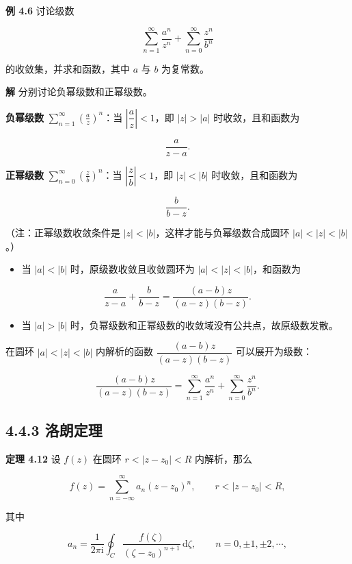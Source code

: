 \textbf{例 4.6} 讨论级数

\[
\sum_{n=1}^{\infty}\frac{a^n}{z^n}+\sum_{n=0}^{\infty}\frac{z^n}{b^n}
\]

的收敛集，并求和函数，其中 \(a\) 与 \(b\) 为复常数。

\textbf{解} 分别讨论负幂级数和正幂级数。

\textbf{负幂级数}
\(\displaystyle\sum_{n=1}^{\infty}\left(\frac{a}{z}\right)^n\)：当
\(\left|\dfrac{a}{z}\right|<1\)，即 \(|z|>|a|\) 时收敛，且和函数为

\[
\frac{a}{z-a}.
\]

\textbf{正幂级数}
\(\displaystyle\sum_{n=0}^{\infty}\left(\frac{z}{b}\right)^n\)：当
\(\left|\dfrac{z}{b}\right|<1\)，即 \(|z|<|b|\) 时收敛，且和函数为

\[
\frac{b}{b-z}.
\]

（注：正幂级数收敛条件是 \(|z|<|b|\)，这样才能与负幂级数合成圆环
\(|a|<|z|<|b|\)。）

\begin{itemize}
\tightlist
\item
  当 \(|a|<|b|\) 时，原级数收敛且收敛圆环为 \(|a|<|z|<|b|\)，和函数为
\end{itemize}

\[
\frac{a}{z-a}+\frac{b}{b-z}=\frac{(a-b)z}{(a-z)(b-z)} .
\]

\begin{itemize}
\tightlist
\item
  当 \(|a|>|b|\)
  时，负幂级数和正幂级数的收敛域没有公共点，故原级数发散。
\end{itemize}

在圆环 \(|a|<|z|<|b|\) 内解析的函数 \(\dfrac{(a-b)z}{(a-z)(b-z)}\)
可以展开为级数：

\[
\frac{(a-b)z}{(a-z)(b-z)}=\sum_{n=1}^{\infty}\frac{a^n}{z^n}+\sum_{n=0}^{\infty}\frac{z^n}{b^n}.
\]

\subsection{4.4.3 洛朗定理}\label{ux6d1bux6717ux5b9aux7406}

\textbf{定理 4.12} 设 \(f(z)\) 在圆环 \(r<|z-z_0|<R\) 内解析，那么

\[
f(z)=\sum_{n=-\infty}^{\infty}a_n(z-z_0)^n,\qquad r<|z-z_0|<R,
\]

其中

\[
a_n=\frac{1}{2\pi\mathrm{i}}\oint_C\frac{f(\zeta)}{(\zeta-z_0)^{n+1}}\,\mathrm{d}\zeta,\qquad n=0,\pm1,\pm2,\cdots,
\]

